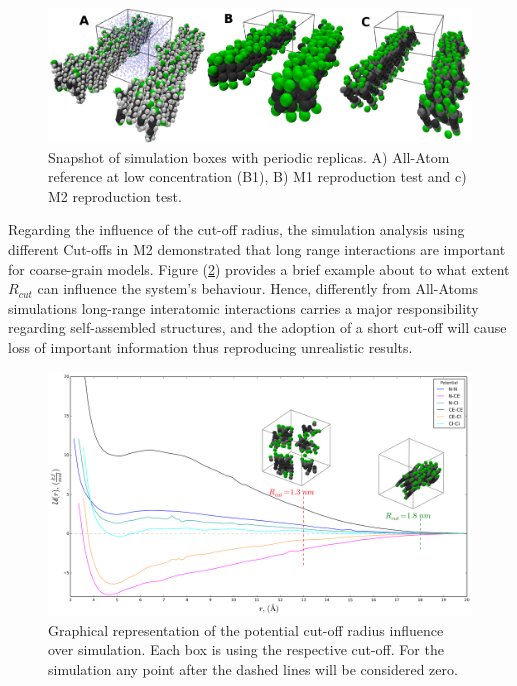 \documentclass[10pt,a4paper,twoside]{article}
\begin{document}
   

     \begin{figure}[ht!]
  \begin{center}
	\includegraphics[width=1 \textwidth]{./images/M1M2box}
	\caption{Snapshot of simulation boxes with periodic replicas. A) All-Atom reference at low concentration (B1), B) M1 reproduction test and c) M2 reproduction test.}
	\label{Fig:M1M2box}
  \end{center}
\end{figure}

Regarding the influence of the cut-off radius, the simulation analysis using different Cut-offs in M2 demonstrated that long range interactions are important for coarse-grain models. Figure (\ref{Fig:M2cut}) provides a brief example about to what extent  $R_{cut}$ can influence the system's behaviour. Hence, differently from All-Atoms simulations long-range interatomic interactions carries a major responsibility regarding self-assembled structures, and the adoption of a short cut-off will cause loss of important information thus reproducing unrealistic results.

 \begin{figure}[ht!]
  \begin{center}
	\includegraphics[width=1 \textwidth]{./images/M2cut}
	\caption{Graphical representation of the potential cut-off radius influence over simulation. Each box is using the respective cut-off. For the simulation any point after the dashed lines will be considered zero. }
	\label{Fig:M2cut}
  \end{center}
\end{figure}
\end{document}
